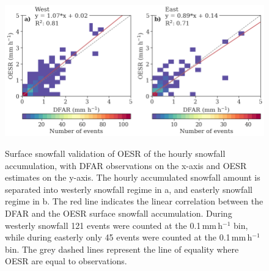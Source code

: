 \documentclass{ametsocV5}
\begin{document}
\begin{figure}
	\noindent\includegraphics[width=\textwidth,angle=0]{fig8.png}\\
	\caption{Surface snowfall validation of OESR of the hourly snowfall accumulation, with DFAR observations on the x-axis and OESR estimates on the y-axis. The hourly accumulated snowfall amount is separated into westerly snowfall regime in a, and easterly snowfall regime in b. The red line indicates the linear correlation between the DFAR and the OESR surface snowfall accumulation. During westerly snowfall 121 events were counted at the 0.1\,mm\,h$^{-1}$ bin, while during easterly only 45 events were counted at the 0.1\,mm\,h$^{-1}$ bin. The grey dashed lines represent the line of equality where OESR are equal to observations.
	}
	\label{fig:sfc_oesr}
\end{figure}
\end{document}
